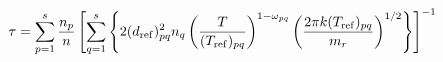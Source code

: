 \documentclass[12pt]{article}
\begin{document}
$$ 
  \tau = \sum_{p=1}^{s} \frac{n_{p}}{n} \left [ \sum_{q=1}^{s}  \left \{ 2(d_{\rm ref})^2_{pq} n_{q} \left (\frac{T}{(T_{\rm ref})_{pq}} \right )^{1 - \omega_{pq}} \left ( \frac{2 \pi k (T_{\rm ref})_{pq}}{m_{r}} \right )^{1/2} \right \} \right ]^{-1}
$$
\end{document}
